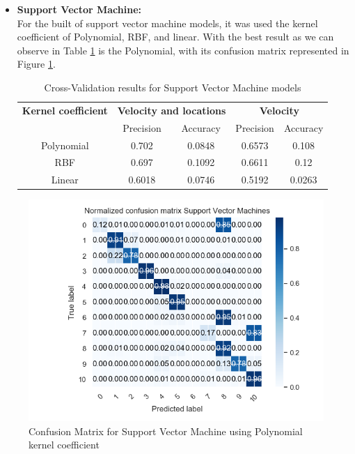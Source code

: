 \begin{itemize}
\newpage
\item \textbf{Support Vector Machine: }\\
For the built of support vector machine models, it was used the kernel coefficient of Polynomial, RBF, and linear. With the best result as we can observe in Table \ref{table:cross_val_svm} is the Polynomial, with its confusion matrix represented in Figure \ref{fig:cm_cvm}. 



\begin {table}[H]
\begin{center}
\begin{tabular}{c|c|c|c|c}
\multicolumn{1}{c|}{\textbf{Kernel coefficient } } &\multicolumn{2}{c|}{\textbf{ Velocity and locations}}& \multicolumn{2}{c}{\textbf{ Velocity}}\\
&Precision & Accuracy & Precision & Accuracy \\
\hline
Polynomial &0.702 &0.0848 & 0.6573&0.108\\
RBF &0.697&0.1092 & 0.6611&0.12\\
Linear &0.6018&0.0746 & 0.5192&0.0263
\label{table:cross_val_svm}
\end{tabular}
\caption {Cross-Validation results for Support Vector Machine models}
\end{center}
\end {table}

\end{itemize}

\begin{figure}[h]
\centering
\includegraphics[width=0.8\linewidth]{Chapters/img/CM_SVM.png}
\caption{Confusion Matrix for Support Vector Machine using Polynomial kernel coefficient}
\label{fig:cm_cvm}
\end{figure}


